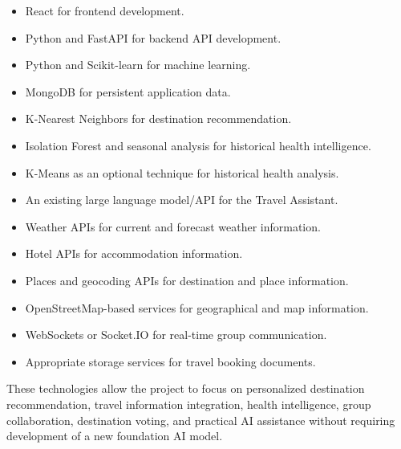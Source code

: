 \documentclass[11pt,a4paper]{article}
\begin{document}
\begin{itemize}

\item React for frontend development.

\item Python and FastAPI for backend API development.

\item Python and Scikit-learn for machine learning.

\item MongoDB for persistent application data.

\item K-Nearest Neighbors for destination recommendation.

\item Isolation Forest and seasonal analysis for historical health intelligence.

\item K-Means as an optional technique for historical health analysis.

\item An existing large language model/API for the Travel Assistant.

\item Weather APIs for current and forecast weather information.

\item Hotel APIs for accommodation information.

\item Places and geocoding APIs for destination and place information.

\item OpenStreetMap-based services for geographical and map information.

\item WebSockets or Socket.IO for real-time group communication.

\item Appropriate storage services for travel booking documents.

\end{itemize}

These technologies allow the project to focus on personalized destination recommendation, travel information integration, health intelligence, group collaboration, destination voting, and practical AI assistance without requiring development of a new foundation AI model.


\end{document}
